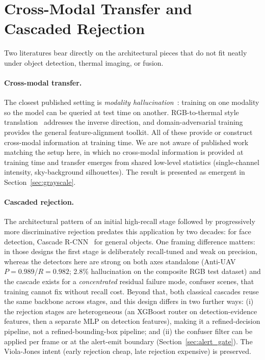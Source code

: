 \section{Cross-Modal Transfer and Cascaded Rejection}
\label{sec:lit_xmodal_cascade}

Two literatures bear directly on the architectural pieces that do not fit neatly under object detection, thermal imaging, or fusion.

\paragraph{Cross-modal transfer.}
The closest published setting is \emph{modality hallucination}~\cite{hoffman2016modalityhallucination}: training on one modality so the model can be queried at test time on another. RGB-to-thermal style translation~\cite{berg2018rgb2thermal,kniaz2018thermalgan} addresses the inverse direction, and domain-adversarial training~\cite{ganin2016domain} provides the general feature-alignment toolkit. All of these provide or construct cross-modal information at training time. We are not aware of published work matching the setup here, in which no cross-modal information is provided at training time and transfer emerges from shared low-level statistics (single-channel intensity, sky-background silhouettes). The result is presented as emergent in Section~\ref{sec:grayscale}.

\paragraph{Cascaded rejection.}
The architectural pattern of an initial high-recall stage followed by progressively more discriminative rejection predates this application by two decades: \citet{viola2001rapid} for face detection, Cascade R-CNN~\cite{cai2018cascade} for general objects. One framing difference matters: in those designs the first stage is deliberately recall-tuned and weak on precision, whereas the detectors here are strong on both axes standalone (Anti-UAV $P=0.989$/$R=0.982$; 2.8\% hallucination on the composite RGB test dataset) and the cascade exists for a \emph{concentrated} residual failure mode, confuser scenes, that training cannot fix without recall cost. Beyond that, both classical cascades reuse the same backbone across stages, and this design differs in two further ways: (i) the rejection stages are heterogeneous (an XGBoost router on detection-evidence features, then a separate MLP on detection features), making it a refined-decision pipeline, not a refined-bounding-box pipeline; and (ii) the confuser filter can be applied per frame or at the alert-emit boundary (Section~\ref{sec:alert_gate}). The Viola-Jones intent (early rejection cheap, late rejection expensive) is preserved.

